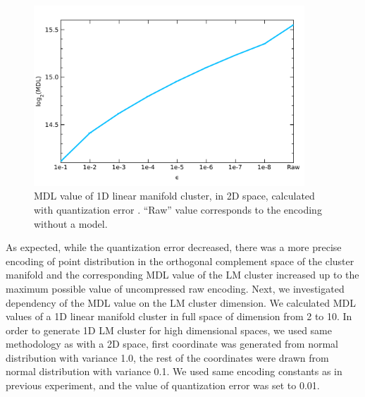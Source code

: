 
\begin{figure}[ht]
\center
\includegraphics[width=4in]{img/results_mdl-exp1_1.pdf}
\caption{MDL value of 1D linear manifold cluster, in 2D space, calculated with quantization error \textepsilon. ``Raw'' value corresponds to the encoding without a model.}
\label{fig:mdl-exp1}
\end{figure}



As expected, while the quantization error decreased, there was a more
precise encoding of point distribution in the orthogonal complement space of the
cluster manifold and  the corresponding MDL value of the LM cluster increased
up to the maximum possible value of uncompressed raw encoding.
\bigskip
%
Next, we investigated dependency of the MDL value on the LM cluster dimension. We
calculated MDL values of a 1D linear manifold cluster in full space of dimension
from 2 to 10. In order to generate 1D LM cluster for high dimensional spaces,
we used same methodology as with a 2D space, first coordinate was generated from
normal distribution with variance 1.0, the rest of the coordinates were drawn
from normal distribution with variance 0.1. We used same encoding constants as
in previous experiment, and the value of quantization error was set to 0.01.

